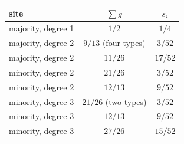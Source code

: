 \documentclass[aps,prx,onecolumn,10pt,nofootinbib,longbibliography,floatfix]{revtex4-2}
\theoremstyle{remark}
\begin{document}
\begin{table}[h]
\vspace{6pt} %
\begin{tabular}{l@{\qquad}c@{\qquad}c}
site & $\sum g$ & $s_i$\\ \hline
majority, degree 1 & $1/2$ & $1/4$\\ %
majority, degree 2 & $9/13$ (four types) & $3/52$\\ %
majority, degree 2 & $11/26$ & $17/52$\\ %
minority, degree 2 & $21/26$ & $3/52$\\ %
minority, degree 2 & $12/13$ & $9/52$\\ %
minority, degree 3 & $21/26$ (two types) & $3/52$\\ %
minority, degree 3 & $12/13$ & $9/52$\\ %
minority, degree 3 & $27/26$ & $15/52$\\ %
\end{tabular}
\end{table}
\end{document}
